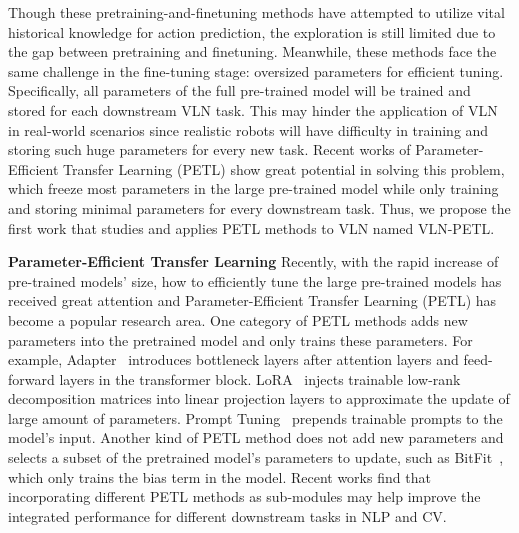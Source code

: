 \documentclass[10pt,twocolumn,letterpaper]{article}
\begin{document}
Though these pretraining-and-finetuning methods have attempted to utilize vital historical knowledge for action prediction, the exploration is still limited due to the gap between pretraining and finetuning. Meanwhile, these methods face the same challenge in the fine-tuning stage: oversized parameters for efficient tuning. Specifically, all parameters of the full pre-trained model will be trained and stored for each downstream VLN task. This may hinder the application of VLN in real-world scenarios since realistic robots will have difficulty in training and storing such huge parameters for every new task. Recent works of Parameter-Efficient Transfer Learning (PETL) show great potential in solving this problem, which freeze most parameters in the large pre-trained model while only training and storing minimal parameters for every downstream task.
Thus, we propose the first work that studies and applies PETL methods to VLN named VLN-PETL. 


\noindent\textbf{Parameter-Efficient Transfer Learning}
Recently, with the rapid increase of pre-trained models' size, how to efficiently tune the large pre-trained models has received great attention and Parameter-Efficient Transfer Learning (PETL) has become a popular research area. 
One category of PETL methods adds new parameters into the pretrained model and only trains these parameters. For example, Adapter~\cite{houlsby2019adapter} introduces bottleneck layers after attention layers and feed-forward layers in the transformer block. LoRA~\cite{hu2021lora} injects trainable low-rank decomposition matrices into linear projection layers to approximate the update of large amount of parameters. Prompt Tuning~\cite{lester-etal-2021-power} prepends trainable prompts to the model's input. Another kind of PETL method does not add new parameters and selects a subset of the pretrained model's parameters to update, such as BitFit~\cite{BenZaken2022BitFitSP}, which only trains the bias term in the model. Recent works \cite{unified-petl,unipelt,zhang2022hyperpelt} find that incorporating different PETL methods as sub-modules may help improve the integrated performance for different downstream tasks in NLP and CV.
\end{document}

